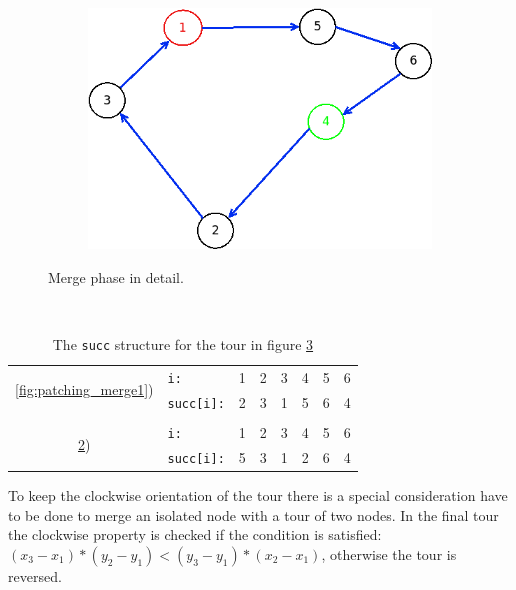 \begin{figure}[!h]
\begin{subfigure}{.26\columnwidth}
		\caption{}
		\label{fig:patching_merge2}
	\end{subfigure}
	\hfill%
	\begin{subfigure}{.26\columnwidth}
		\includegraphics[width=\columnwidth]{img/patching_merge3.png}
		\caption{}
		\label{fig:patching_merge3}
	\end{subfigure}

	\caption{Merge phase in detail.}
	\label{fig:patching_merge}
\end{figure}\\

\begin{table}[h]
	\centering
	\caption{The \texttt{succ} structure for the tour in figure \ref{fig:patching_merge}}
	\begin{tabular}{clcccccc}
		\multirow{2}{*}{\ref{fig:patching_merge1})} 	& \texttt{i:}		& 1 & 2 & 3 & 4 & 5 & 6 \\
														& \texttt{succ[i]:}	& 2 & 3 & 1 & 5 & 6 & 4 \\
														&		   			&   &   &   &   &   &   \\
		\multirow{2}{*}{\ref{fig:patching_merge3})} 	& \texttt{i:}		& 1 & 2 & 3 & 4 & 5 & 6 \\
														& \texttt{succ[i]:}	& 5 & 3 & 1 & 2 & 6 & 4 \\
	\end{tabular}
\end{table}
To keep the clockwise orientation of the tour there is a special consideration have to be done to merge an isolated node with a tour of two nodes. In the final tour the clockwise property is checked if the condition is satisfied:
$ (x_3 - x_1)*(y_2 - y_1) < (y_3 - y_1)*(x_2 - x_1) $,
otherwise the tour is reversed.


